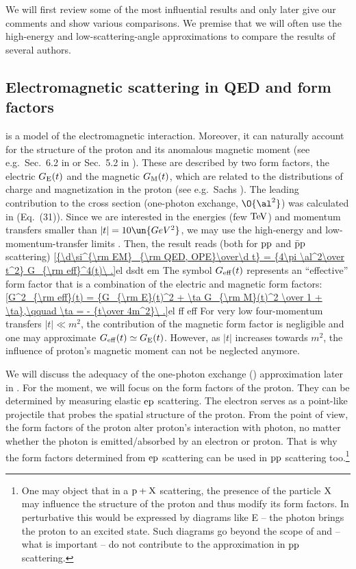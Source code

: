 We will first review some of the most influential results and only later give our comments and show various comparisons. We premise that we will often use the high-energy and low-scattering-angle approximations to compare the results of several authors.


\subsection[em sc qed]{Electromagnetic scattering in QED and form factors}

 is a  model of the electromagnetic interaction. Moreover, it can naturally account for the structure of the proton and its anomalous magnetic moment (see e.g.~Sec.~6.2 in  or Sec.~5.2 in ). These are described by two form factors, the electric $G_{\rm E}(t)$ and the magnetic $G_{\rm M}(t)$, which are related to the distributions of charge and magnetization in the proton (see e.g.~Sachs ). The leading contribution to the cross section (one-photon exchange, $\O{\al^2}$) was calculated in  (Eq.~(31)). Since we are interested in the  energies (few $\rm TeV$) and momentum transfers smaller than $|t| = 10\un{GeV^2}$, we may use the high-energy and low-momentum-transfer limits . Then, the result reads (both for $\rm pp$ and $\rm \bar p p$ scattering)
\eqref{{\d\si^{\rm EM}_{\rm QED, OPE}\over\d t} = {4\pi \al^2\over t^2} G_{\rm eff}^4(t)\ .}{el dsdt em}
The symbol $G_{\rm eff}(t)$ represents an ``effective'' form factor that is a combination of the electric and magnetic form factors:
\eqref{G^2_{\rm eff}(t) = {G_{\rm E}(t)^2 + \ta G_{\rm M}(t)^2 \over 1 + \ta},\qquad \ta = - {t\over 4m^2}\ .}{el ff eff}
For very low four-momentum transfers $|t| \ll m^2$, the contribution of the magnetic form factor is negligible and one may approximate $G_{\rm eff}(t) \simeq G_{\rm E}(t)$. However, as $|t|$ increases towards $m^2$, the influence of proton's magnetic moment can not be neglected anymore.

We will discuss the adequacy of the one-photon exchange () approximation later in . For the moment, we will focus on the form factors of the proton. They can be determined by measuring elastic $\rm ep$ scattering. The electron serves as a point-like projectile that probes the spatial structure of the proton. From the  point of view, the form factors of the proton alter proton's interaction with photon, no matter whether the photon is emitted/absorbed by an electron or proton. That is why the form factors determined from $\rm ep$ scattering can be used in $\rm pp$ scattering too.\footnote{%
One may object that in a $\rm p+X$ scattering, the presence of the particle $\rm X$ may influence the structure of the proton and thus modify its form factors. In perturbative  this would be expressed by diagrams like  E -- the photon brings the proton to an excited state. Such diagrams go beyond the scope of  and -- what is important -- do not contribute to the  approximation in $\rm pp$ scattering.
}

